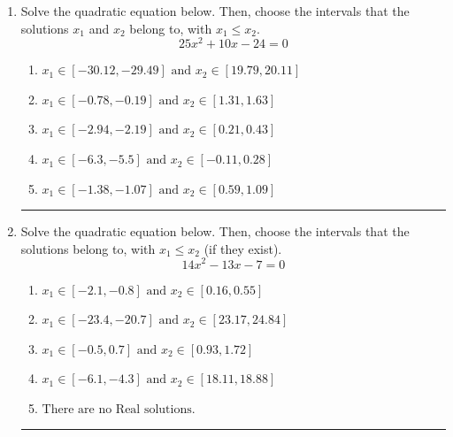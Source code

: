 \documentclass[14pt]{extbook}
\newcommand{\litem}[1]{\item#1\hspace*{-1cm}\rule{\textwidth}{0.4pt}}
\begin{document}
\begin{enumerate}
\litem{
Solve the quadratic equation below. Then, choose the intervals that the solutions $x_1$ and $x_2$ belong to, with $x_1 \leq x_2$.\[ 25x^{2} +10 x -24 = 0 \]\begin{enumerate}[label=\Alph*.]
\item \( x_1 \in [-30.12, -29.49] \text{ and } x_2 \in [19.79, 20.11] \)
\item \( x_1 \in [-0.78, -0.19] \text{ and } x_2 \in [1.31, 1.63] \)
\item \( x_1 \in [-2.94, -2.19] \text{ and } x_2 \in [0.21, 0.43] \)
\item \( x_1 \in [-6.3, -5.5] \text{ and } x_2 \in [-0.11, 0.28] \)
\item \( x_1 \in [-1.38, -1.07] \text{ and } x_2 \in [0.59, 1.09] \)

\end{enumerate} }
\litem{
Solve the quadratic equation below. Then, choose the intervals that the solutions belong to, with $x_1 \leq x_2$ (if they exist).\[ 14x^{2} -13 x -7 = 0 \]\begin{enumerate}[label=\Alph*.]
\item \( x_1 \in [-2.1, -0.8] \text{ and } x_2 \in [0.16, 0.55] \)
\item \( x_1 \in [-23.4, -20.7] \text{ and } x_2 \in [23.17, 24.84] \)
\item \( x_1 \in [-0.5, 0.7] \text{ and } x_2 \in [0.93, 1.72] \)
\item \( x_1 \in [-6.1, -4.3] \text{ and } x_2 \in [18.11, 18.88] \)
\item \( \text{There are no Real solutions.} \)


\end{enumerate}}
\end{enumerate}
\end{document}
